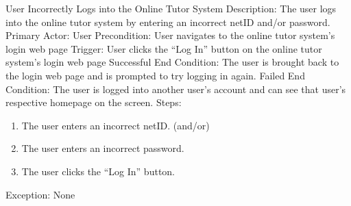    \begin{section}{User Incorrectly Logs into the Online Tutor System}
        Description: The user logs into the online tutor system by entering an incorrect netID and/or password. \newline
        Primary Actor: User \newline
        Precondition: User navigates to the online tutor system’s login web page \newline
        Trigger: User clicks the “Log In” button on the online tutor system’s login web page \newline
        Successful End Condition: The user is brought back to the login web page and is prompted to try logging in again. \newline
        Failed End Condition: The user is logged into another user’s account and can see that user’s respective homepage on the screen. \newline
        \newline
        Steps:
        \begin{enumerate}
            \item{The user enters an incorrect netID. \newline
	              (and/or)}
            \item{The user enters an incorrect password.}
            \item{The user clicks the “Log In” button.}
        \end{enumerate}
        Exception: None
    \end{section}
    
